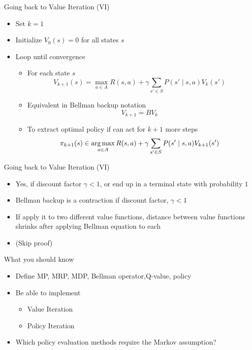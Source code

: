 \begin{frame}[c]{Going back to Value Iteration (VI)}

\begin{itemize}
	\item  Set $k = 1$
	\item Initialize $V_0(s) = 0$ for all states $s$
	\item Loop until convergence
	\begin{itemize}
		\item For each state $s$
		$$V_{k+1}(s) = \max_{a\in A } R(s,a) + \gamma \sum_{s' \in S } P(s' \mid s,a) V_k(s') $$
		\item Equivalent in Bellman backup notation
				$$ V_{k+1} = BV_k$$
		\item To extract optimal policy if can act for $k+1$ more steps
		$$\pi_{k+1}(s) \in \operatorname*{arg\,max}_{a \in A} R(s,a) + \gamma \sum_{s' \in S} P(s' \mid s,a) V_{k+1}(s') $$
	\end{itemize}
	
\end{itemize}

\end{frame}
\begin{frame}[c]{Going back to Value Iteration (VI)}

\begin{itemize}
	\item  Yes, if discount factor $\gamma < 1$, or end up in a terminal state with
	probability $1$
	\item 	Bellman backup is a contraction if discount factor, $\gamma <  1$
	\item If apply it to two different value functions, distance between value functions shrinks after applying Bellman equation to each
	\item (Skip proof)
\end{itemize}

\end{frame}
\begin{frame}[c]{What you should know}

\begin{itemize}
	\item  Define MP, MRP, MDP, Bellman operator,Q-value, policy
	\item Be able to implement
	\begin{itemize}
		\item Value Iteration
		\item Policy Iteration
	\end{itemize}
	\item Which policy evaluation methods require the Markov assumption?
\end{itemize}

\end{frame}



